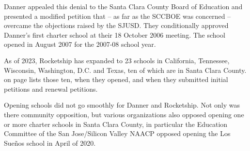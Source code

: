 Danner appealed this denial to the Santa Clara County Board of Education and presented a modified petition that – as far as the SCCBOE was concerned – overcame the objections raised by the SJUSD. They conditionally approved Danner's first charter school at their 18 October 2006 meeting. The school opened in August 2007 for the 2007-08 school year.

As of 2023, Rocketship has expanded to 23 schools in California, Tennessee, Wisconsin, Washington, D.C. and Texas, ten of which are in Santa Clara County.  on page \pageref{tab:RocketshipSchools} lists those ten, when they opened, and when they submitted initial petitions and renewal petitions.

Opening schools did not go smoothly for Danner and Rocketship. Not only was there community opposition, but various organizations also opposed opening one or more charter schools in Santa Clara County, in particular the Education Committee of the San Jose/Silicon Valley NAACP opposed opening the Los Sueños school in April of 2020\parencite{MooreII.Marachi2020}.

